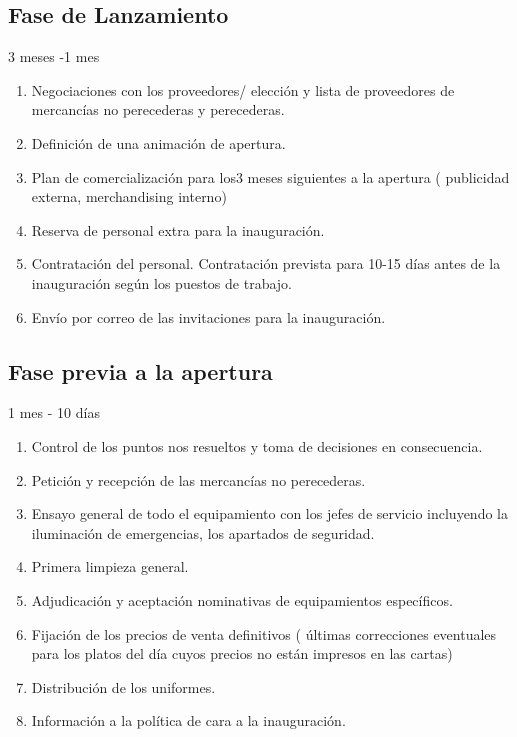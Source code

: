 \subsection{Fase de Lanzamiento}
\label{sec:lanzamiento}

3 meses -1 mes

\begin{enumerate}
\item Negociaciones con los proveedores/ elección y lista de proveedores de mercancías no perecederas y perecederas.
\item Definición de una animación de apertura.
\item Plan de comercialización para los3 meses siguientes a la apertura ( publicidad externa, merchandising interno)
\item Reserva de personal extra para la inauguración.
\item Contratación del personal. Contratación prevista para 10-15 días antes de la inauguración según los puestos de trabajo.
\item Envío por correo de las invitaciones para la inauguración.
\end{enumerate}

\subsection{Fase previa a la apertura}
\label{sec:previa}
1 mes - 10 días

\begin{enumerate}
\item Control de los puntos nos resueltos y toma de decisiones en consecuencia.
\item Petición y recepción de las mercancías no perecederas.
\item Ensayo general de todo el equipamiento con los jefes de servicio incluyendo la iluminación de emergencias, los apartados de seguridad.
\item Primera limpieza general.
\item Adjudicación y aceptación nominativas de equipamientos específicos.
\item Fijación de los precios de venta definitivos ( últimas correcciones eventuales para los platos del día cuyos precios no están impresos en las cartas)
\item Distribución de los uniformes.
\item Información a la política de cara a la inauguración.
\end{enumerate}

